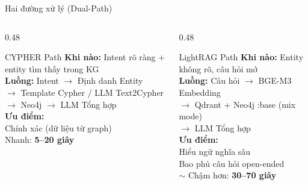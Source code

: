 \documentclass[aspectratio=169, 11pt]{beamer}
\begin{document}
\begin{frame}{Hai đường xử lý (Dual-Path)}
  \begin{columns}[t]
    \begin{column}{0.48\textwidth}
      \begin{block}{CYPHER Path}
        \scriptsize
        \textbf{Khi nào:} Intent rõ ràng + entity tìm thấy trong KG\\[3pt]
        \textbf{Luồng:} Intent $\to$ Định danh Entity\\
        $\to$ Template Cypher / LLM Text2Cypher\\
        $\to$ Neo4j $\to$ LLM Tổng hợp\\[3pt]
        \textbf{Ưu điểm:}\\
        \textcolor{successGreen}{\checkmark} Chính xác (dữ liệu từ graph)\\
        \textcolor{successGreen}{\checkmark} Nhanh: \textbf{5--20 giây}
      \end{block}
    \end{column}
    \begin{column}{0.48\textwidth}
      \begin{block}{LightRAG Path}
        \scriptsize
        \textbf{Khi nào:} Entity không rõ, câu hỏi mở\\[3pt]
        \textbf{Luồng:} Câu hỏi $\to$ BGE-M3 Embedding\\
        $\to$ Qdrant + Neo4j :base (mix mode)\\
        $\to$ LLM Tổng hợp\\[3pt]
        \textbf{Ưu điểm:}\\
        \textcolor{successGreen}{\checkmark} Hiểu ngữ nghĩa sâu\\
        \textcolor{successGreen}{\checkmark} Bao phủ câu hỏi open-ended\\
        \textcolor{warnOrange}{$\sim$} Chậm hơn: \textbf{30--70 giây}
      \end{block}
    \end{column}
  \end{columns}
\end{frame}
\end{document}

